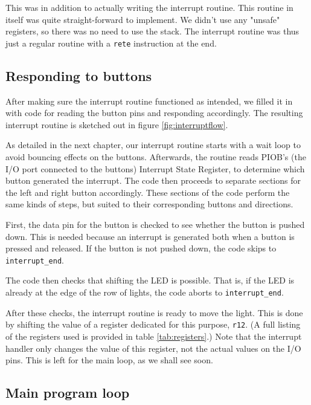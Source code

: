 This was in addition to actually writing the interrupt routine. This
routine in itself was quite straight-forward to implement. We didn't use
any "unsafe" registers, so there was no need to use the stack. The
interrupt routine was thus just a regular routine with a \texttt{rete}
instruction at the end.

\subsection{Responding to buttons}

After making sure the interrupt routine functioned as intended, we
filled it in with code for reading the button pins and responding
accordingly. The resulting interrupt routine is sketched out in figure
\ref{fig:interruptflow}.



As detailed in the next chapter, our interrupt routine starts with a
wait loop to avoid bouncing effects on the buttons. Afterwards, the
routine reads PIOB's (the I/O port connected to the buttons) Interrupt
State Register, to determine which button generated the interrupt. The
code then proceeds to separate sections for the left and right button
accordingly. These sections of the code perform the same kinds of steps,
but suited to their corresponding buttons and directions.

First, the data pin for the button is checked to see whether the button
is pushed down. This is needed because an interrupt is generated both
when a button is pressed and released. If the button is not pushed down,
the code skips to \texttt{interrupt\_end}.

The code then checks that shifting the LED is possible. That is, if the
LED is already at the edge of the row of lights, the code aborts to
\texttt{interrupt\_end}.

After these checks, the interrupt routine is ready to move the light.
This is done by shifting the value of a register dedicated for this
purpose, \texttt{r12}. (A full listing of the registers used is provided
in table \ref{tab:registers}.) Note that the interrupt handler only
changes the value of this register, not the actual values on the I/O
pins. This is left for the main loop, as we shall see soon.





\subsection{Main program loop}

